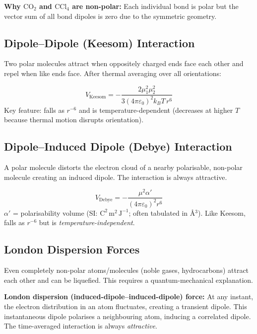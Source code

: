 \documentclass[12pt,a4paper]{article}
\begin{document}
\textbf{Why $\mathrm{CO_2}$ and $\mathrm{CCl_4}$ are non-polar:} Each individual bond is polar but the vector sum of all bond dipoles is zero due to the symmetric geometry.

\subsection{Dipole--Dipole (Keesom) Interaction}
Two polar molecules attract when oppositely charged ends face each other and repel when like ends face. After thermal averaging over all orientations:

\begin{tcolorbox}[formulabox, title={Keesom Orientational Energy (Thermal Average)}]
\[
V_{\mathrm{Keesom}} = -\frac{2\mu_1^2\mu_2^2}{3(4\pi\varepsilon_0)^2 k_B T\,r^6}
\]
Key feature: falls as $r^{-6}$ and is temperature-dependent (decreases at higher $T$ because thermal motion disrupts orientation).
\end{tcolorbox}

\subsection{Dipole--Induced Dipole (Debye) Interaction}
A polar molecule distorts the electron cloud of a nearby polarisable, non-polar molecule creating an induced dipole. The interaction is always attractive.

\begin{tcolorbox}[formulabox, title={Debye Induction Energy}]
\[
V_{\mathrm{Debye}} = -\frac{\mu^2\alpha'}{(4\pi\varepsilon_0)^2 r^6}
\]
$\alpha'$ = polarisability volume (SI: $\mathrm{C^2\,m^2\,J^{-1}}$; often tabulated in \r{A}$^3$). Like Keesom, falls as $r^{-6}$ but is \emph{temperature-independent}.
\end{tcolorbox}

\subsection{London Dispersion Forces}
Even completely non-polar atoms/molecules (noble gases, hydrocarbons) attract each other and can be liquefied. This requires a quantum-mechanical explanation.

\begin{tcolorbox}[defbox]
\textbf{London dispersion (induced-dipole--induced-dipole) force:} At any instant, the electron distribution in an atom fluctuates, creating a transient dipole. This instantaneous dipole polarises a neighbouring atom, inducing a correlated dipole. The time-averaged interaction is always \emph{attractive}.
\end{tcolorbox}
\end{document}
